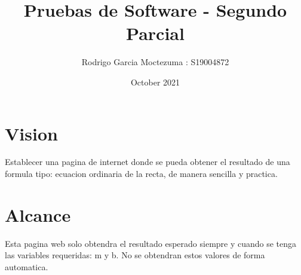 \documentclass{article}
\title{Pruebas de Software - Segundo Parcial}
\author{Rodrigo Garcia Moctezuma : S19004872}
\date{October 2021}
\begin{document}
\maketitle

\section{Vision}

Establecer una pagina de internet donde se pueda obtener el resultado de una formula tipo:
ecuacion ordinaria de la recta, de manera sencilla y practica.

\section{Alcance}

Esta pagina web solo obtendra el resultado esperado siempre y cuando se tenga las variables
requeridas: m y b. No se obtendran estos valores de forma automatica.
\end{document}
